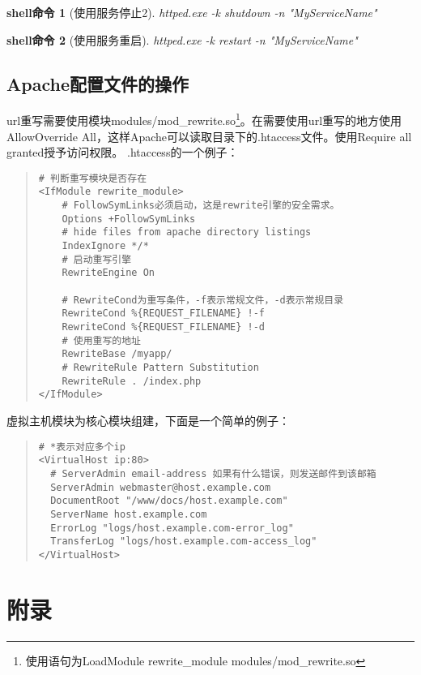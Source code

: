 \documentclass[UTF8]{ctexart}
\newtheorem{shellcommand}{shell命令}
\newenvironment{myquote}
  {\begin{quote} \kaishu \zihao{-5}}
  {\end{quote}}
\begin{document}
\begin{shellcommand}[使用服务停止2]
  httped.exe -k shutdown -n "MyServiceName"
\end{shellcommand}

\begin{shellcommand}[使用服务重启]
  httped.exe -k restart -n "MyServiceName"
\end{shellcommand}

\subsection{Apache配置文件的操作}
url重写需要使用模块modules/mod\_rewrite.so\footnote{使用语句为LoadModule rewrite\_module modules/mod\_rewrite.so}。在需要使用url重写的地方使用AllowOverride  All，这样Apache可以读取目录下的.htaccess文件。使用Require all granted授予访问权限。
.htaccess的一个例子：
\begin{myquote}
  \begin{verbatim}
# 判断重写模块是否存在
<IfModule rewrite_module>
    # FollowSymLinks必须启动，这是rewrite引擎的安全需求。
    Options +FollowSymLinks
    # hide files from apache directory listings
    IndexIgnore */*
    # 启动重写引擎
    RewriteEngine On

    # RewriteCond为重写条件，-f表示常规文件，-d表示常规目录
    RewriteCond %{REQUEST_FILENAME} !-f
    RewriteCond %{REQUEST_FILENAME} !-d
    # 使用重写的地址
    RewriteBase /myapp/
    # RewriteRule Pattern Substitution 
    RewriteRule . /index.php
</IfModule>
  \end{verbatim}
\end{myquote}

虚拟主机模块为核心模块组建，下面是一个简单的例子：
\begin{myquote}
  \begin{verbatim}
# *表示对应多个ip
<VirtualHost ip:80>
  # ServerAdmin email-address 如果有什么错误，则发送邮件到该邮箱
  ServerAdmin webmaster@host.example.com
  DocumentRoot "/www/docs/host.example.com"
  ServerName host.example.com
  ErrorLog "logs/host.example.com-error_log"
  TransferLog "logs/host.example.com-access_log"
</VirtualHost>
  \end{verbatim}
\end{myquote}
\clearpage


\section{附录}
\end{document}
